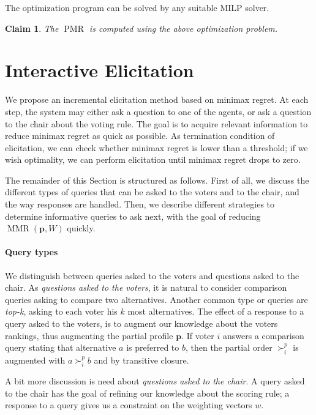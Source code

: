 \documentclass[12pt]{article}
\newcommand{\pprofile}{\textbf{p}}%
\DeclareMathOperator{\PMR}{PMR}
\DeclareMathOperator{\MMR}{MMR}
\newtheorem{claim}{Claim}
\begin{document}
The optimization program can be solved by any suitable MILP solver.

\begin{claim}
The $\PMR$ is computed using the above optimization problem.
\end{claim}

 
\section{Interactive Elicitation} \label{sec:elicit}

We propose an incremental elicitation method based on minimax regret.
At each step, the system may either ask a question to one of the agents, or ask a question to the chair about the voting rule. 
The goal is to acquire relevant information to reduce minimax regret as quick as possible.
As termination condition of elicitation, we can check whether minimax regret is lower than a threshold; if we wish optimality, we can perform elicitation until minimax regret drops to zero.

The remainder of this Section is structured as follows.
First of all, we discuss the different types of queries that can be asked to the voters and to the chair, and the way responses are handled.
Then, we describe different strategies to determine informative queries to ask next, with the goal of reducing $\MMR(\pprofile,W)$ quickly.


\paragraph{Query types}
We distinguish between queries asked to the voters and questions asked to the chair.
As {\em questions asked to the voters}, it is natural to consider comparison queries asking to compare two alternatives.
Another common type or queries are {\em top-k}, asking to each voter his $k$ most alternatives.
The effect of a response to a query asked to the voters, is to augment our knowledge about the voters rankings, thus augmenting the partial profile $\pprofile$. 
If voter $i$ answers a comparison query stating that alternative $a$ is preferred to $b$, then the partial order $\succ^{p}_{i}$ is augmented with $a \succ^{p}_{i} b$ and by transitive closure.

A bit more discussion is need about {\em questions asked to the chair}.
A query asked to the chair has the goal of refining our knowledge about the scoring rule;
a response to a query gives us a constraint on the weighting vectors $w$.
\end{document}
